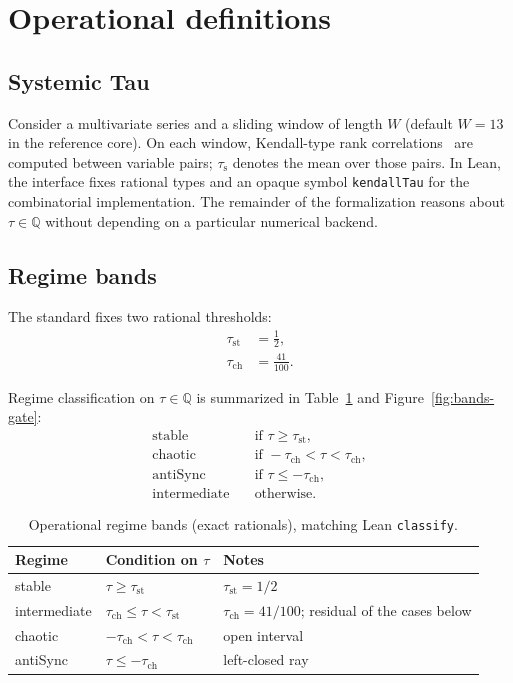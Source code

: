 \documentclass[11pt,a4paper]{article}
\newcommand{\taus}{\tau_{\mathrm{s}}}
\newcommand{\taust}{\tau_{\mathrm{st}}}
\newcommand{\tauch}{\tau_{\mathrm{ch}}}
\begin{document}
\section{Operational definitions}

\subsection{Systemic Tau}

Consider a multivariate series and a sliding window of length \(W\) (default \(W=13\) in the reference core). On each window, Kendall-type rank correlations~\cite{kendall1938} are computed between variable pairs; \(\taus\) denotes the mean over those pairs. In Lean, the interface fixes rational types and an opaque symbol \texttt{kendallTau} for the combinatorial implementation. The remainder of the formalization reasons about \(\tau\in\mathbb{Q}\) without depending on a particular numerical backend.

\subsection{Regime bands}

The standard fixes two rational thresholds:
\begin{align}
  \taust &= \tfrac{1}{2}, \\
  \tauch &= \tfrac{41}{100}.
\end{align}

Regime classification on \(\tau\in\mathbb{Q}\) is summarized in Table~\ref{tab:bands} and Figure~\ref{fig:bands-gate}:
\begin{align}
  \mathrm{stable}
    &\quad\text{if }\tau \ge \taust, \\
  \mathrm{chaotic}
    &\quad\text{if }-\tauch < \tau < \tauch, \\
  \mathrm{antiSync}
    &\quad\text{if }\tau \le -\tauch, \\
  \mathrm{intermediate}
    &\quad\text{otherwise}.
\end{align}

\begin{table}[ht]
\centering
\caption{Operational regime bands (exact rationals), matching Lean \texttt{classify}.}
\label{tab:bands}
\begin{tabular}{@{}lll@{}}
\toprule
\textbf{Regime} & \textbf{Condition on \(\tau\)} & \textbf{Notes} \\
\midrule
stable & \(\tau \ge \taust\) & \(\taust = 1/2\) \\
intermediate & \(\tauch \le \tau < \taust\) & \(\tauch = 41/100\); residual of the cases below \\
chaotic & \(-\tauch < \tau < \tauch\) & open interval \\
antiSync & \(\tau \le -\tauch\) & left-closed ray \\
\bottomrule
\end{tabular}
\end{table}
\end{document}
